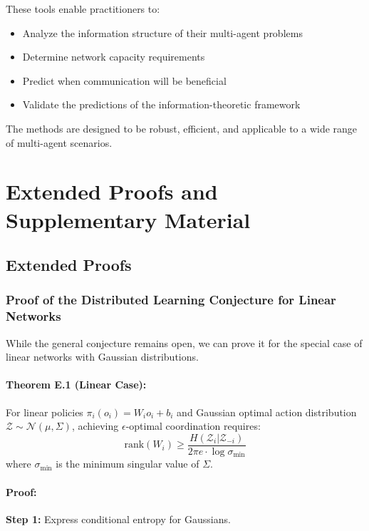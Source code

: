 \documentclass[10pt, letterpaper]{article}
\begin{document}
These tools enable practitioners to:
\begin{itemize}
    \item Analyze the information structure of their multi-agent problems
    \item Determine network capacity requirements
    \item Predict when communication will be beneficial
    \item Validate the predictions of the information-theoretic framework
\end{itemize}

The methods are designed to be robust, efficient, and applicable to a wide range of multi-agent scenarios.

\section{Extended Proofs and Supplementary Material}
\label{app:extended}

\subsection{Extended Proofs}

\subsubsection{Proof of the Distributed Learning Conjecture for Linear Networks}

While the general conjecture remains open, we can prove it for the special case of linear networks with Gaussian distributions.

\paragraph{Theorem E.1 (Linear Case):} For linear policies $\pi_i(o_i) = W_i o_i + b_i$ and Gaussian optimal action distribution $\mathcal{Z} \sim \mathcal{N}(\mu, \Sigma)$, achieving $\epsilon$-optimal coordination requires:
\[\text{rank}(W_i) \geq \frac{H(\mathcal{Z}_i | \mathcal{Z}_{-i})}{2\pi e \cdot \log \sigma_{\min}}\]
where $\sigma_{\min}$ is the minimum singular value of $\Sigma$.

\paragraph{Proof:}

\textbf{Step 1:} Express conditional entropy for Gaussians.
\end{document}
